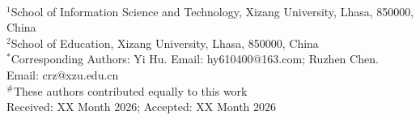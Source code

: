 \documentclass[11pt,letterpaper,onecolumn]{article}
\begin{document}
\vspace{0.55em}

\\[0.35em]
{\fontsize{10}{12.5}\selectfont
\noindent$^{1}$School of Information Science and Technology, Xizang University, Lhasa, 850000, China\\
$^{2}$School of Education, Xizang University, Lhasa, 850000, China\\
$^{*}$Corresponding Authors: Yi Hu. Email: hy610400@163.com; Ruzhen Chen. Email: crz@xzu.edu.cn\\
$^{\#}$These authors contributed equally to this work\\
Received: XX Month 2026; Accepted: XX Month 2026
\par}
\end{document}
